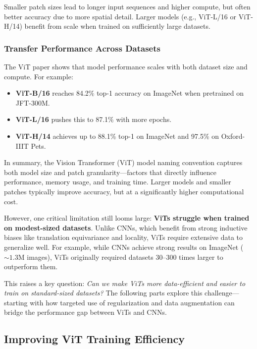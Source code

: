 \noindent
Smaller patch sizes lead to longer input sequences and higher compute, but often better accuracy due to more spatial detail. Larger models (e.g., ViT-L/16 or ViT-H/14) benefit from scale when trained on sufficiently large datasets.

\newpage
\subsubsection{Transfer Performance Across Datasets}

\noindent
The ViT paper \cite{vit2020_transformers} shows that model performance scales with both dataset size and compute. For example:

\begin{itemize}
    \item \textbf{ViT-B/16} reaches 84.2\% top-1 accuracy on ImageNet when pretrained on JFT-300M.
    \item \textbf{ViT-L/16} pushes this to 87.1\% with more epochs.
    \item \textbf{ViT-H/14} achieves up to 88.1\% top-1 on ImageNet and 97.5\% on Oxford-IIIT Pets.
\end{itemize}

\noindent
In summary, the Vision Transformer (ViT) model naming convention captures both model size and patch granularity—factors that directly influence performance, memory usage, and training time. Larger models and smaller patches typically improve accuracy, but at a significantly higher computational cost.

\noindent
However, one critical limitation still looms large: \textbf{ViTs struggle when trained on modest-sized datasets}. Unlike CNNs, which benefit from strong inductive biases like translation equivariance and locality, ViTs require extensive data to generalize well. For example, while CNNs achieve strong results on ImageNet (\(\sim1.3\)M images), ViTs originally required datasets 30–300 times larger to outperform them.

\noindent
This raises a key question: \textit{Can we make ViTs more data-efficient and easier to train on standard-sized datasets?} The following parts explore this challenge—starting with how targeted use of regularization and data augmentation can bridge the performance gap between ViTs and CNNs.


\subsection{Improving ViT Training Efficiency}

